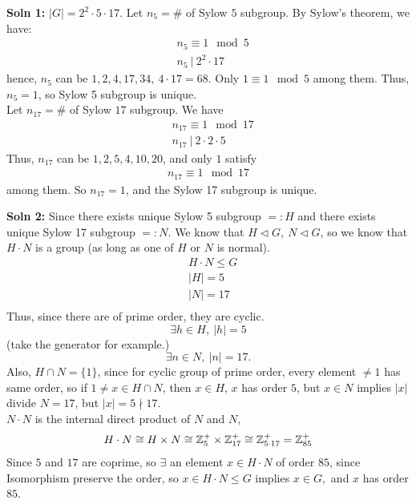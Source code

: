 \documentclass[12pt,english]{article}
\begin{document}
\textbf{Soln 1: }
$\lvert G \rvert = 2^2 \cdot 5 \cdot 17$. Let $n_5 = \#$ of Sylow $5$ subgroup.
By Sylow's theorem, we have:
\begin{align}
    &n_5 \equiv 1 \mod 5\\
    &n_5 \ \vert \ 2^2 \cdot 17
\end{align}
hence, $n_5$ can be $1,2,4,17,34, \ 4\cdot 17 = 68$. 
Only $1 \equiv 1 \mod 5$ among them. Thus, $n_5 = 1$, so Sylow 5 subgroup is unique.\\

Let $n_{17} = \#$ of Sylow $17$ subgroup. We have
\begin{align}
    &n_{17} \equiv 1 \mod 17\\
    &n_{17} \ \vert \ 2\cdot 2 \cdot 5
\end{align}
Thus, $n_{17}$ can be $1,2,5,4,10,20$, and only $1$ satisfy
\begin{align}
    n_{17} \equiv 1 \mod 17
\end{align} among them. So $n_{17} = 1$, and the Sylow 17 subgroup is unique.

\textbf{Soln 2: }
Since there exists unique Sylow 5 subgroup $=: H$
and there exists unique Sylow 17 subgroup $=: N$. 
We know that $H \triangleleft G, \ N \triangleleft G$, so we know that $H\cdot N$ is a group (as long as one of $H$ or $N$ is normal).
\begin{align*}
    & H \cdot N \leq G\\
    & |H| = 5\\
    & |N| = 17\\
\end{align*}
Thus, since there are of prime order, they are cyclic. 
$$\exists h \in H, \ |h|=5$$ (take the generator for example.)
$$ \exists n \in N, \ |n|=17.$$
Also, $H \cap N = \{ 1 \}$, since for cyclic group of prime order, every element $\neq 1$ has same order, 
so if $1\neq x \in H \cap N$, then $x \in H$, $x$ has order $5$, but $x \in N$ implies $|x|$ divide $N=17$, but $|x| = 5 \nmid 17$.\\

$N \cdot N$ is the internal direct product of $N$ and $N$, 
\begin{align}
    H \cdot N \cong H \times N \cong \mathbb{Z}^{+}_5 \times \mathbb{Z}^{+}_{17} \cong \mathbb{Z}^+_{5\cdot 17} = \mathbb{Z}^+_{85}
\end{align}
Since $5$ and $17$ are coprime, so $\exists$ an element $x \in H \cdot N$ of order $85$,
since Isomorphism preserve the order, so $x \in H \cdot N \leq G$ implies $x \in G,$ and $x$ has order $85$. 
\end{document}
